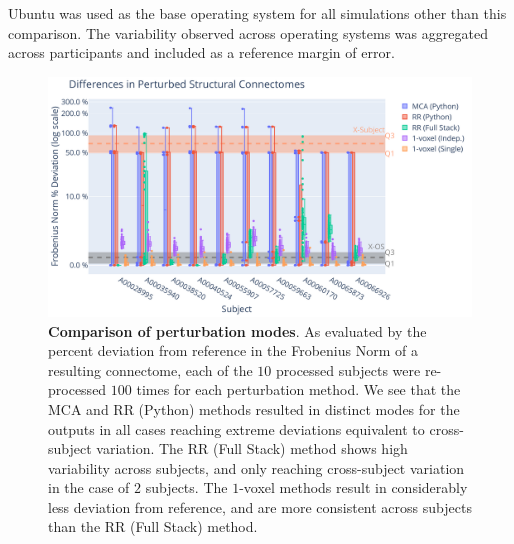 \documentclass[fleqn,12pt]{SelfArx_ch} %
\begin{document}
Ubuntu was used as the base operating system for all simulations other than this comparison. The variability observed
across operating systems was  aggregated across participants and included as a reference margin of error.

\begin{figure}[bth!]
\centerline{\includegraphics[width=1.1\textwidth]{figures/fig2_fro_summary.pdf}}
\caption{\textbf{Comparison of perturbation modes}. As evaluated by the percent
deviation from reference in the Frobenius Norm of a resulting connectome, each
of the $10$ processed subjects were re-processed $100$ times for each perturbation
method. We see that the MCA and RR (Python) methods resulted in distinct modes
for the outputs in all cases reaching extreme deviations equivalent to cross-subject
variation. The RR (Full Stack) method shows high variability across subjects, and
only reaching cross-subject variation in the case of $2$ subjects. The $1$-voxel
methods result in considerably less deviation from reference, and are more consistent
across subjects than the RR (Full Stack) method.}
\label{fig2:summary}
\end{figure}
\end{document}
